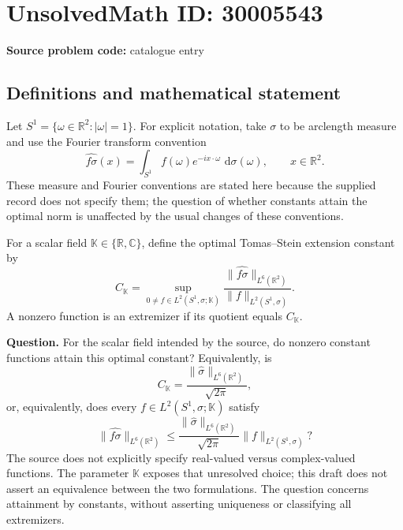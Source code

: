 \documentclass[11pt]{article}
\newcommand{\R}{\mathbb{R}}
\newcommand{\C}{\mathbb{C}}
\newcommand{\dd}{\,\mathrm{d}}
\begin{document}
\section*{UnsolvedMath ID: 30005543}
\textbf{Source problem code:} catalogue entry
\subsection{Definitions and mathematical statement}
Let \(S^1=\{\omega\in\R^2:|\omega|=1\}\). For explicit notation, take \(\sigma\) to be arclength measure and use the Fourier transform convention
\[
\widehat{f\sigma}(x)=\int_{S^1}f(\omega)e^{-i x\cdot\omega}\,\dd\sigma(\omega),\qquad x\in\R^2.
\]
These measure and Fourier conventions are stated here because the supplied record does not specify them; the question of whether constants attain the optimal norm is unaffected by the usual changes of these conventions.

For a scalar field \(\mathbb K\in\{\R,\C\}\), define the optimal Tomas--Stein extension constant by
\[
C_{\mathbb K}=\sup_{0\ne f\in L^2(S^1,\sigma;\mathbb K)}
\frac{\|\widehat{f\sigma}\|_{L^6(\R^2)}}{\|f\|_{L^2(S^1,\sigma)}}.
\]
A nonzero function is an extremizer if its quotient equals \(C_{\mathbb K}\).

\textbf{Question.} For the scalar field intended by the source, do nonzero constant functions attain this optimal constant? Equivalently, is
\[
C_{\mathbb K}=\frac{\|\widehat{\sigma}\|_{L^6(\R^2)}}{\sqrt{2\pi}},
\]
or, equivalently, does every \(f\in L^2(S^1,\sigma;\mathbb K)\) satisfy
\[
\|\widehat{f\sigma}\|_{L^6(\R^2)}
\leq \frac{\|\widehat{\sigma}\|_{L^6(\R^2)}}{\sqrt{2\pi}}
\|f\|_{L^2(S^1,\sigma)}?
\]
The source does not explicitly specify real-valued versus complex-valued functions. The parameter \(\mathbb K\) exposes that unresolved choice; this draft does not assert an equivalence between the two formulations. The question concerns attainment by constants, without asserting uniqueness or classifying all extremizers.
\end{document}
